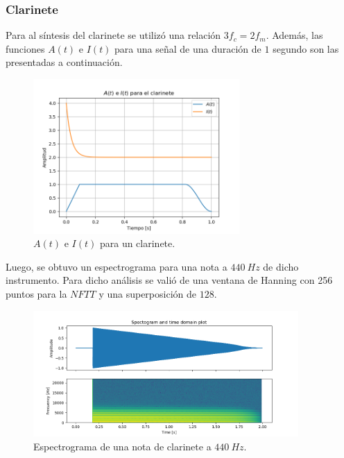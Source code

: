 \subsubsection{Clarinete}
Para al síntesis del clarinete se utilizó una relación $3 f_c  = 2 f_m$. Además, las funciones $A(t)$ e $I(t)$ para una señal de una duración de $1$ segundo son las presentadas a continuación.
\begin{figure}[H]
	\centering
	\includegraphics[width=0.7\textwidth]{ImagenesEjercicio3/A-I-Clarinet.png}
	\caption{$A(t)$ e $I(t)$ para un clarinete.}
	\label{fig:aiclar}
\end{figure}

Luego, se obtuvo un espectrograma para una nota a $440 \ Hz$ de dicho instrumento. Para dicho análisis se valió de una ventana de Hanning con 256 puntos para la $NFTT$ y una superposición de $128$.  
\begin{figure}[H]
	\centering
	\includegraphics[width=0.9\textwidth]{ImagenesEjercicio3/Clarinet-440-Hanning-256-128.png}
	\caption{Espectrograma de una nota de clarinete a $440 \ Hz$.}
	\label{fig:specclar}
\end{figure}


